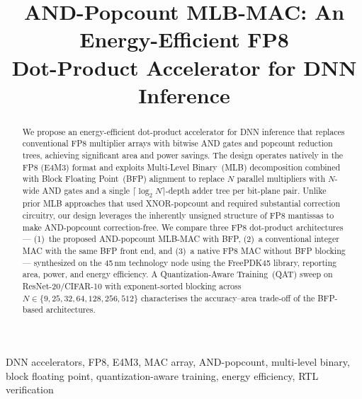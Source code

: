 \documentclass[conference]{IEEEtran}
\begin{document}
\title{AND-Popcount MLB-MAC: An Energy-Efficient FP8\\
Dot-Product Accelerator for DNN Inference}

\author{
\and
{}
\and
{}
}

\maketitle

\begin{abstract}
We propose an energy-efficient dot-product accelerator for DNN
inference that replaces conventional FP8 multiplier arrays with
bitwise AND gates and popcount reduction trees, achieving significant
area and power savings.  The design operates natively in the FP8
(E4M3) format and exploits Multi-Level Binary~(MLB) decomposition
combined with Block Floating Point~(BFP) alignment to replace $N$
parallel multipliers with $N$-wide AND gates and a single
$\lceil\log_2 N\rceil$-depth adder tree per bit-plane pair.  Unlike
prior MLB approaches that used XNOR-popcount and required
substantial correction circuitry, our design leverages the inherently
unsigned structure of FP8 mantissas to make AND-popcount
correction-free.  We compare three FP8 dot-product architectures ---
(1)~the proposed AND-popcount MLB-MAC with BFP, (2)~a conventional
integer MAC with the same BFP front end, and (3)~a native FP8 MAC
without BFP blocking --- synthesized on the
45\,nm technology node using the FreePDK45 library, reporting
area, power, and energy efficiency.  A Quantization-Aware Training~(QAT) sweep on
ResNet-20/CIFAR-10 with exponent-sorted blocking across
$N \in \{9, 25, 32, 64, 128, 256, 512\}$ characterises the
accuracy--area trade-off of the BFP-based architectures.
\end{abstract}

\begin{IEEEkeywords}
DNN accelerators, FP8, E4M3, MAC array, AND-popcount, multi-level
binary, block floating point, quantization-aware training, energy
efficiency, RTL verification
\end{IEEEkeywords}
\end{document}

